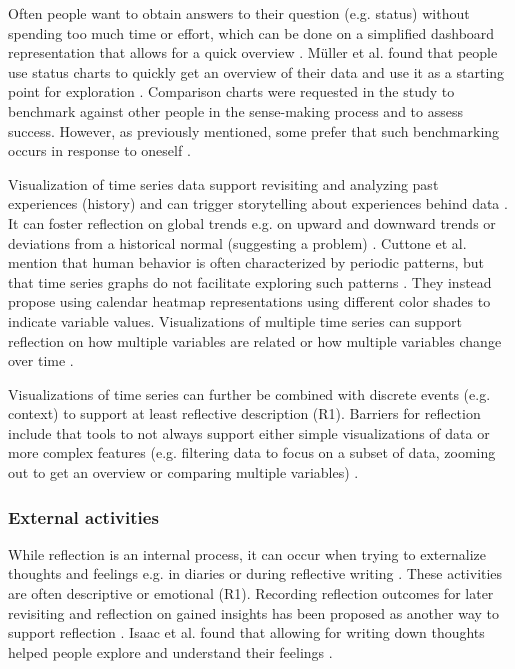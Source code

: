 Often people want to obtain answers to their question (e.g. status) without spending too much time or effort, which can be done on a simplified dashboard representation that allows for a quick overview \cite{Cutone}. Müller et al. found that people use status charts to quickly get an overview of their data and use it as a starting point for exploration \cite{Muller}. Comparison charts were requested in the study to benchmark against other people in the sense-making process and to assess success. However, as previously mentioned, some prefer that such benchmarking occurs in response to oneself \cite{Ancker2015}. 

Visualization of time series data support revisiting and analyzing past experiences (history) and can trigger storytelling about experiences behind data \cite{Rivera, Muller}. It can foster reflection on global trends e.g. on upward and downward trends or deviations from a historical normal (suggesting a problem) \cite{Rivera}. Cuttone et al. mention that human behavior is often characterized by periodic patterns, but that time series graphs do not facilitate exploring such patterns \cite{Cuttone}. They instead propose using calendar heatmap representations using different color shades to indicate variable values. Visualizations of multiple time series can support reflection on how multiple variables are related or how multiple variables change over time \cite{Cuttone}. 

Visualizations of time series can further be combined with discrete events \cite{Sorensen} (e.g. context) to support at least reflective description (R1). Barriers for reflection include that tools to not always support either simple visualizations of data or more complex features (e.g. filtering data to focus on a subset of data, zooming out to get an overview or comparing multiple variables) \cite{Li2011, MacLeod}. 

\subsubsection{External activities}
While reflection is an internal process, it can occur when trying to externalize thoughts and feelings e.g. in diaries or during reflective writing \cite{Mols}. These activities are often descriptive or emotional (R1). Recording reflection outcomes for later revisiting and reflection on gained insights has been proposed as another way to support reflection \cite{Isaac, Muller}. Isaac et al. found that allowing for writing down thoughts helped people explore and understand their feelings \cite{Isaac}. 

